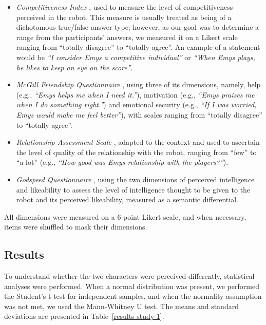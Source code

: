 \begin{itemize}
\item \textit{Competitiveness Index} \cite{smither1992nature}, used to measure the level of competitiveness perceived in the robot. This measure is usually treated as being of a dichotomous true/false answer type; however, as our goal was to determine a range from the participants' answers, we measured it on a Likert scale ranging from ``totally disagree'' to ``totally agree''. An example of a statement would be \textit{``I consider Emys a competitive individual''} or \textit{``When Emys plays, he likes to keep an eye on the score''}.

\item \textit{McGill Friendship Questionnaire} \cite{mendelson1999measuring}, using three of its dimensions, namely, help (e.g., \textit{``Emys helps me when I need it.''}), motivation (e.g., \textit{``Emys praises me when I do something right.''}) and emotional security (e.g., \textit{``If I was worried, Emys would make me feel better''}), with scales ranging from ``totally disagree'' to ``totally agree''.

\item \textit{Relationship Assessment Scale} \cite{hendrick1988generic}, a\-dapted to the context and used to ascertain the level of quality of the relationship with the robot, ranging from ``few'' to ``a lot'' (e.g., \textit{``How good was Emys relationship with the players?''}).

\item \textit{Godspeed Questionnaire} \cite{bartneck2009measurement}, using the two dimensions of perceived intelligence and likeability to assess the level of intelligence thought to be given to the robot and its perceived likeability, measured as a semantic differential.
\end{itemize}
All dimensions were measured on a 6-point Likert scale, and when necessary, items were shuffled to mask their dimensions.

\subsection{Results}
To understand whether the two characters were perceived differently, statistical analyses were performed. When a normal distribution was present, we performed the Student's t-test for independent samples, and when the normality assumption was not met, we used the Mann-Whitney U test. The means and standard deviations are presented in Table~\ref{results-study-1}.

